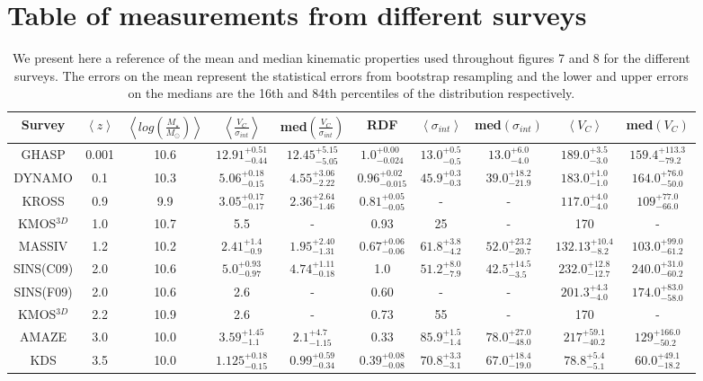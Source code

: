 \documentclass[fleqn,usenatbib]{mn2e}
\begin{document}
\section{Table of measurements from different surveys}
\begin{table*}
\centering
\caption{We present here a reference of the mean and median kinematic properties used throughout figures 7 and 8 for the different surveys.
The errors on the mean represent the statistical errors from bootstrap resampling and the lower and upper errors on the medians are the 16th and 84th percentiles of the distribution respectively.}
\label{tab:evolution_numbers}
\begin{tabular}{c c c c c c c c c c }

 \hline
Survey & $\left< z \right> $ & $\left< log\left(\frac{M_{\star}}{M_{\odot}}\right)\right>$ & $\left< \frac{V_{C}}{\sigma_{int}} \right>$ & med$\left(\frac{V_{C}}{\sigma_{int}}\right)$ & RDF & $ \left< \sigma_{int} \right>$ & med$\left(\sigma_{int}\right)$ & $\left<V_{C}\right>$ & med$\left(V_{C}\right)$  \\
 \hline
 GHASP & 0.001 & 10.6 & $12.91^{+0.51}_{-0.44}$ & $12.45^{+5.15}_{-5.05}$ & $1.0^{+0.00}_{-0.024}$ & $13.0^{+0.5}_{-0.5}$ & $13.0^{+6.0}_{-4.0}$ & $189.0^{+3.5}_{-3.0}$ & $159.4^{+113.3}_{-79.2}$ \\
 DYNAMO & 0.1 & 10.3 & $5.06^{+0.18}_{-0.15}$ & $4.55^{+3.06}_{-2.22}$ & $0.96^{+0.02}_{-0.015}$ & $45.9^{+0.3}_{-0.3}$ & $39.0^{+18.2}_{-21.9}$ & $183.0^{+1.0}_{-1.0}$ & $164.0^{+76.0}_{-50.0}$ \\
 KROSS & 0.9 & 9.9 & $3.05^{+0.17}_{-0.17}$ & $2.36^{+2.64}_{-1.46}$ & $0.81^{+0.05}_{-0.05}$ & - & - & $117.0^{+4.0}_{-4.0}$ & $109^{+77.0}_{-66.0}$ \\
 KMOS$^{3D}$ & 1.0 & 10.7 & 5.5 & - & 0.93 & 25 & - & 170 & - \\
 MASSIV & 1.2 & 10.2 & $2.41^{+1.4}_{-0.9}$ & $1.95^{+2.40}_{-1.31}$ & $0.67^{+0.06}_{-0.06}$ & $61.8^{+3.8}_{-4.2}$ & $52.0^{+23.2}_{-20.7}$ & $132.13^{+10.4}_{-8.2}$ & $103.0^{+99.0}_{-61.2}$ \\
 SINS(C09) & 2.0 & 10.6 & $5.0^{+0.93}_{-0.97}$ & $4.74^{+1.11}_{-0.18}$ & 1.0 & $51.2^{+8.0}_{-7.9}$ & $42.5^{+14.5}_{-3.5}$ & $232.0^{+12.8}_{-12.7}$ & $240.0^{+31.0}_{-60.2}$ \\
 SINS(F09) & 2.0 & 10.6 & 2.6 & - & 0.60 & - & - & $201.3^{+4.3}_{-4.0}$ & $174.0^{+83.0}_{-58.0}$ \\
 KMOS$^{3D}$ & 2.2 & 10.9 & 2.6 & - & 0.73 & 55 & - & 170 & - \\
 AMAZE & 3.0 & 10.0 & $3.59^{+1.45}_{-1.1}$ & $2.1^{+4.7}_{-1.15}$ & 0.33 & $85.9^{+1.5}_{-1.4}$ & $78.0^{+27.0}_{-48.0}$ & $217^{+59.1}_{-40.2}$ & $129^{+166.0}_{-50.2}$ \\
 KDS & 3.5 & 10.0 & $1.125^{+0.18}_{-0.15}$ & $0.99^{+0.59}_{-0.34}$ & $0.39^{+0.08}_{-0.08}$ & $70.8^{+3.3}_{-3.1}$ & $67.0^{+18.4}_{-19.0}$ & $78.8^{+5.4}_{-5.1}$ & $60.0^{+49.1}_{-18.2}$ \\
 \hline
\end{tabular}
\end{table*}
\end{document}
